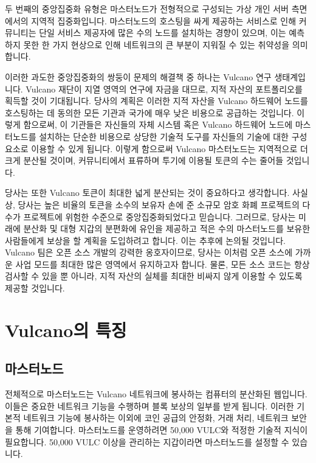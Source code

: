 \documentclass[A4paper, 12pt]{article}
\begin{document}
두 번째의 중앙집중화 유형은 마스터노드가 전형적으로 구성되는 가상 개인 서버 측면에서의 지역적 집중화입니다. 마스터노드의 호스팅을 싸게 제공하는 서비스로 인해 커뮤니티는 단일 서비스 제공자에 많은 수의 노드를 설치하는 경향이 있으며, 이는 예측하지 못한 한 가지 현상으로 인해 네트워크의 큰 부분이 지워질 수 있는 취약성을 의미합니다.

이러한 과도한 중앙집중화의 쌍둥이 문제의 해결책 중 하나는 Vulcano 연구 생태계입니다. Vulcano 재단이 지열 영역의 연구에 자금을 대므로, 지적 자산의 포트폴리오를 획득할 것이 기대됩니다. 당사의 계획은 이러한 지적 자산을 Vulcano 하드웨어 노드를 호스팅하는 데 동의한 모든 기관과 국가에 매우 낮은 비용으로 공급하는 것입니다.  이렇게 함으로써, 이 기관들은 자신들의 자체 시스템 혹은 Vulcano 하드웨어 노드에 마스터노드를 설치하는 단순한 비용으로 상당한 기술적 도구를 자신들의 기술에 대한 구성 요소로 이용할 수 있게 됩니다. 이렇게 함으로써 Vulcano 마스터노드는 지역적으로 더 크게 분산될 것이며, 커뮤니티에서 표류하며 투기에 이용될 토큰의 수는 줄어들 것입니다.

당사는 또한 Vulcano 토큰이 최대한 넓게 분산되는 것이 중요하다고 생각합니다. 사실상, 당사는 높은 비율의 토큰을 소수의 보유자 손에 준 소규모 암호 화폐 프로젝트의 다수가 프로젝트에 위험한 수준으로 중앙집중화되었다고 믿습니다. 그러므로, 당사는 미래에 분산화 및 대형 지갑의 분편화에 유인을 제공하고 적은 수의 마스터노드를 보유한 사람들에게 보상을 할 계획을 도입하려고 합니다. 이는 추후에 논의될 것입니다.
Vulcano 팀은 오픈 소스 개발의 강력한 옹호자이므로, 당사는 이처럼 오픈 소스에 가까운 사업 모드를 최대한 많은 영역에서 유지하고자 합니다. 물론, 모든 소스 코드는 항상 검사할 수 있을 뿐 아니라, 지적 자산의 실체를 최대한 비싸지 않게 이용할 수 있도록 제공할 것입니다.




\section{Vulcano의 특징}
\subsection {마스터노드}
전체적으로 마스터노드는 Vulcano 네트워크에 봉사하는 컴퓨터의 분산화된 웹입니다. 이들은 중요한 네트워크 기능을 수행하며 블록 보상의 일부를 받게 됩니다. 이러한 기본적 네트워크 기능에 봉사하는 이외에 코인 공급의 안정화, 거래 처리, 네트워크 보안을 통해 기여합니다. 마스터노드를 운영하려면 50,000 VULC와 적정한 기술적 지식이 필요합니다. 50,000 VULC 이상을 관리하는 지갑이라면 마스터노드를 설정할 수 있습니다.
\end{document}
